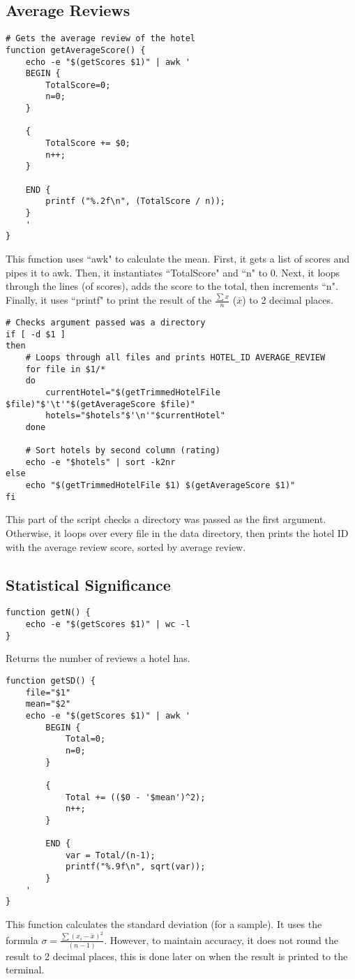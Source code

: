\documentclass[a4paper]{article}
\begin{document}
%
\newpage
\subsection{Average Reviews}
\begin{lstlisting}
# Gets the average review of the hotel
function getAverageScore() {
	echo -e "$(getScores $1)" | awk '
	BEGIN {
		TotalScore=0;
		n=0;
	}

	{
		TotalScore += $0;
		n++;
	}

	END {
		printf ("%.2f\n", (TotalScore / n));
	}
	'
}
\end{lstlisting}
This function uses ``awk" to calculate the mean.
First, it gets a list of scores and pipes it to awk.
Then, it instantiates ``TotalScore" and ``n" to 0.
Next, it loops through the lines (of scores), adds the score to the total, then increments ``n".
Finally, it uses ``printf" to print the result of the $\frac{\sum{x}}{n}$ ($\bar{x}$) to 2 decimal places.


\begin{lstlisting}
# Checks argument passed was a directory
if [ -d $1 ]
then
	# Loops through all files and prints HOTEL_ID AVERAGE_REVIEW
	for file in $1/*
	do
		currentHotel="$(getTrimmedHotelFile $file)"$'\t'"$(getAverageScore $file)"
		hotels="$hotels"$'\n'"$currentHotel"
	done
	
	# Sort hotels by second column (rating)
	echo -e "$hotels" | sort -k2nr
else
	echo "$(getTrimmedHotelFile $1) $(getAverageScore $1)"
fi
\end{lstlisting}
This part of the script checks a directory was passed as the first argument.
Otherwise, it loops over every file in the data directory, then prints the hotel ID with the average review score, sorted by average review.

%
\newpage
\subsection{Statistical Significance}

\begin{lstlisting}
function getN() {
	echo -e "$(getScores $1)" | wc -l
}
\end{lstlisting}
Returns the number of reviews a hotel has.

\begin{lstlisting}
function getSD() {
	file="$1"
	mean="$2"
	echo -e "$(getScores $1)" | awk '
		BEGIN {
			Total=0;
			n=0;
		}

		{
			Total += (($0 - '$mean')^2);
			n++;
		}

		END {
			var = Total/(n-1);
			printf("%.9f\n", sqrt(var));
		}
	'
}
\end{lstlisting}
This function calculates the standard deviation (for a sample).
It uses the formula $\sigma = \frac{\sum{(x_i - \bar{x})^2}}{(n-1)}$.
However, to maintain accuracy, it does not round the result to 2 decimal places, this is done later on when the result is printed to the terminal.
\end{document}
